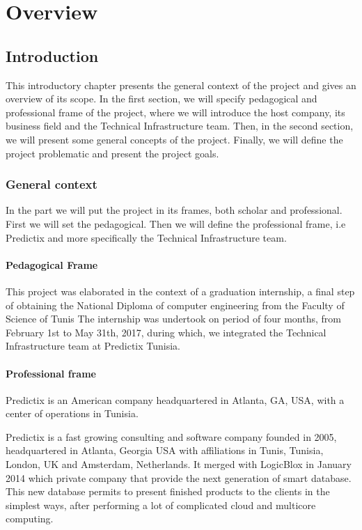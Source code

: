 \chapter{Overview}

\section{Introduction}
This introductory chapter presents the general context of the project and gives
an overview of its scope. In the first section, we will specify pedagogical and
professional frame of the project, where we will introduce the host company, its
business field  and the Technical Infrastructure team. Then, in the second
section, we will present some general concepts of the project. Finally, we will
define the project problematic and present the project goals.


\subsection{General context}
In the part we will put the project in its frames, both scholar and
professional. First we will set the pedagogical. Then we will define the
professional frame, i.e Predictix and more specifically the Technical
Infrastructure team.

\subsubsection{Pedagogical Frame}
This project was elaborated in the context of a graduation internship, a final
step of obtaining the National Diploma of computer engineering from the Faculty
of Science of Tunis
The internship was undertook on period of four months, from February 1st to
May 31th, 2017, during which, we integrated the Technical Infrastructure team at
Predictix Tunisia.
\subsubsection{Professional frame}
Predictix is an American company headquartered in Atlanta, GA, USA, with a
center of operations in Tunisia.

Predictix is a fast growing consulting and software company founded in 2005,
headquartered in Atlanta, Georgia USA with affiliations in Tunis, Tunisia,
London, UK and Amsterdam, Netherlands. It merged with LogicBlox in January 2014
which private company that provide the next generation of smart database. This
new database permits to present finished products to the clients in the simplest
ways, after performing a lot of complicated cloud and multicore computing.

